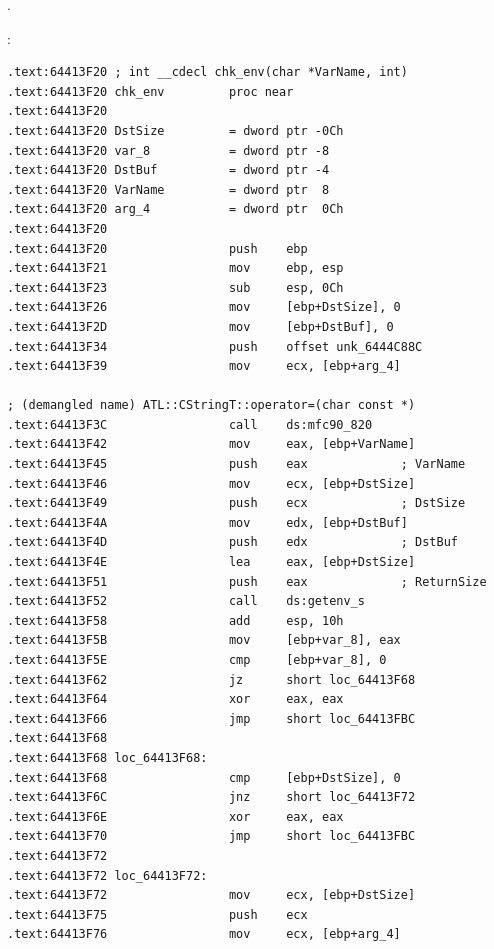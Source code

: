 .

:

\begin{lstlisting}
.text:64413F20 ; int __cdecl chk_env(char *VarName, int)
.text:64413F20 chk_env         proc near
.text:64413F20
.text:64413F20 DstSize         = dword ptr -0Ch
.text:64413F20 var_8           = dword ptr -8
.text:64413F20 DstBuf          = dword ptr -4
.text:64413F20 VarName         = dword ptr  8
.text:64413F20 arg_4           = dword ptr  0Ch
.text:64413F20
.text:64413F20                 push    ebp
.text:64413F21                 mov     ebp, esp
.text:64413F23                 sub     esp, 0Ch
.text:64413F26                 mov     [ebp+DstSize], 0
.text:64413F2D                 mov     [ebp+DstBuf], 0
.text:64413F34                 push    offset unk_6444C88C
.text:64413F39                 mov     ecx, [ebp+arg_4]

; (demangled name) ATL::CStringT::operator=(char const *)
.text:64413F3C                 call    ds:mfc90_820 
.text:64413F42                 mov     eax, [ebp+VarName]
.text:64413F45                 push    eax             ; VarName
.text:64413F46                 mov     ecx, [ebp+DstSize]
.text:64413F49                 push    ecx             ; DstSize
.text:64413F4A                 mov     edx, [ebp+DstBuf]
.text:64413F4D                 push    edx             ; DstBuf
.text:64413F4E                 lea     eax, [ebp+DstSize]
.text:64413F51                 push    eax             ; ReturnSize
.text:64413F52                 call    ds:getenv_s
.text:64413F58                 add     esp, 10h
.text:64413F5B                 mov     [ebp+var_8], eax
.text:64413F5E                 cmp     [ebp+var_8], 0
.text:64413F62                 jz      short loc_64413F68
.text:64413F64                 xor     eax, eax
.text:64413F66                 jmp     short loc_64413FBC
.text:64413F68
.text:64413F68 loc_64413F68:
.text:64413F68                 cmp     [ebp+DstSize], 0
.text:64413F6C                 jnz     short loc_64413F72
.text:64413F6E                 xor     eax, eax
.text:64413F70                 jmp     short loc_64413FBC
.text:64413F72
.text:64413F72 loc_64413F72:
.text:64413F72                 mov     ecx, [ebp+DstSize]
.text:64413F75                 push    ecx
.text:64413F76                 mov     ecx, [ebp+arg_4]


\end{lstlisting}

